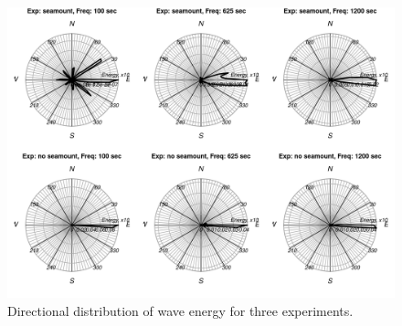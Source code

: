 \begin{figure}
\centering
\includegraphics[scale=0.5]{../figures/spectra_windrose_circ_sm.png}
\caption{Directional distribution of wave energy for three experiments.}
\end{figure}




